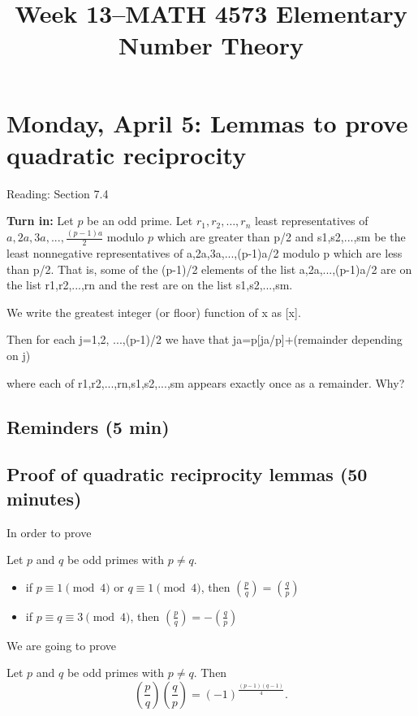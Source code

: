\documentclass[letterpaper, 11 pt]{article}
\title{Week 13--MATH 4573 Elementary Number Theory}
\begin{document}
\maketitle
\section{Monday, April 5: Lemmas to prove quadratic reciprocity}
Reading: Section 7.4

{\bf Turn in: }
Let $p$ be an odd prime. Let $ r_1,r_2,\dots,r_n$ least representatives of $a,2a,3a,...,\frac{(p-1)a}{2}$ modulo $p$ which are greater than p/2 and s1,s2,...,sm be the least nonnegative representatives of a,2a,3a,...,(p-1)a/2 modulo p which are less than p/2. That is, some of the (p-1)/2 elements of the list a,2a,...,(p-1)a/2 are on the list r1,r2,...,rn  and the rest are on the list s1,s2,...,sm.

We write the greatest integer (or floor) function of x as [x].

Then for each j=1,2, ...,(p-1)/2 we have that ja=p[ja/p]+(remainder depending on j)

where each of r1,r2,...,rn,s1,s2,...,sm appears exactly once as a remainder. Why?
\subsection{Reminders (5 min)}

\subsection{Proof of quadratic reciprocity lemmas (50 minutes)}

In order to prove 
\begin{thm}
 Let $p$ and $q$ be odd primes with $p\neq q$. 
\begin{itemize}
 \item if $p\equiv 1 \pmod 4$ or $q\equiv 1 \pmod 4$, then $\left(\frac{p}{q}\right)=\left(\frac{q}{p}\right)$
 \item if $p\equiv q\equiv 3 \pmod 4$, then $\left(\frac{p}{q}\right)=-\left(\frac{q}{p}\right)$
\end{itemize}
\end{thm}

We are going to prove 
\begin{thm}
 Let $p$ and $q$ be odd primes with $p\neq q$. Then \[\left(\frac{p}{q}\right)\left(\frac{q}{p}\right)=(-1)^{\frac{(p-1)(q-1)}{4}}.\]
\end{thm}
\end{document}
